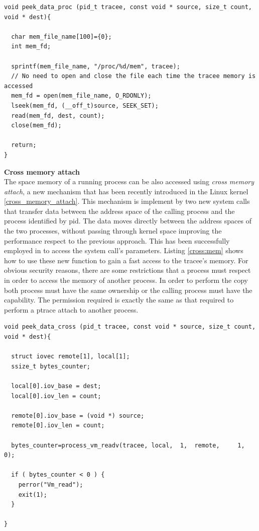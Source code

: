 \begin{center}
\lstset{escapechar=@,style=c}
\begin{lstlisting}[label=proc:mem, caption={Function which retrieve a buffer of size count from the tracee memory using the proc interface. }]
void peek_data_proc (pid_t tracee, const void * source, size_t count, void * dest){

  char mem_file_name[100]={0};
  int mem_fd; 
  
  sprintf(mem_file_name, "/proc/%d/mem", tracee);
  // No need to open and close the file each time the tracee memory is accessed 
  mem_fd = open(mem_file_name, O_RDONLY);
  lseek(mem_fd, (__off_t)source, SEEK_SET);
  read(mem_fd, dest, count);
  close(mem_fd); 
  
  return;
}
\end{lstlisting}
\end{center}

 
\textbf{Cross memory attach}\\
The space memory of a running process can be also accessed using \emph{cross memory attach}, a new mechanism that has been recently introduced in the Linux kernel
 \ref{cross_memory_attach}. This mechanism is implement by two new system calls \cite{cross_memory_attach_syscall} that transfer data between the address space of the calling process and the process identified by pid.  The data moves directly between the address spaces of the two processes, without passing through kernel space improving the performance respect to the previous  approach. This has been successfully employed in \cite{mx:icse13} to access the system call's parameters. Listing \ref{cross:mem} shows how to use these new function to gain a fast access to the tracee's memory. For obvious security reasons, there are some restrictions that a process must respect in order to access the memory of another process. In order to perform the copy both process must have the same ownership or the calling process must have the  capability. The permission required is exactly the same as that required to perform a ptrace attach to another process. 

\begin{center}
\lstset{escapechar=@,style=c}
\begin{lstlisting}[label=cross:mem, caption={Function which retrieve a buffer of size count from the tracee memory using cross memory attach method. }]
void peek_data_cross (pid_t tracee, const void * source, size_t count, void * dest){
  
  struct iovec remote[1], local[1]; 
  ssize_t bytes_counter; 

  local[0].iov_base = dest;
  local[0].iov_len = count;
  
  remote[0].iov_base = (void *) source;
  remote[0].iov_len = count;

  bytes_counter=process_vm_readv(tracee, local,	 1,	 remote,	 1,		 0);

  if ( bytes_counter < 0 ) {
    perror("Vm_read"); 
    exit(1); 
  }
  
}
\end{lstlisting}
\end{center}


